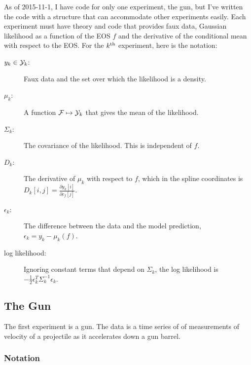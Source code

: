 \documentclass[11pt]{article}
\newcommand{\eos}{f}
\newcommand{\EOS}{{\cal F}}
\newcommand{\data}{y}
\newcommand{\DATA}{{\cal Y}}
\newcommand\cf{c_f}
\begin{document}
As of 2015-11-1, I have code for only one experiment, the gun, but
I've written the code with a structure that can accommodate other
experiments easily.  Each experiment must have theory and code that
provides faux data, Gaussian likelihood as a function of the EOS
$\eos$ and the derivative of the conditional mean with respect to the
EOS.  For the $k^{\rm th}$ experiment, here is the notation:
\begin{description}
\item[$\data_k\in \DATA_k$:] Faux data and the set over which the
  likelihood is a density.
\item[$\mu_k$:] A function $\EOS\mapsto \DATA_k$ that gives the mean
  of the likelihood.
\item[$\Sigma_k$:] The covariance of the likelihood.  This is
  independent of $\eos$.
\item[$D_k$:] The derivative of $\mu_k$ with respect to $\eos$, which
  in the spline coordinates is
  $D_k[i,j] =\frac{\partial \data_k[i]}{\partial \cf[j]}$.
\item[$\epsilon_k$:] The difference between the data and the model
  prediction, $\epsilon_k = \data_k - \mu_k(\eos)$.
\item[log likelihood:] Ignoring constant terms that depend on
  $\Sigma_k$, the log likelihood is $-\frac{1}{2}\epsilon_k^T
  \Sigma_k^{-1} \epsilon_k$.
\end{description}

\subsection{The Gun}
\label{sec:gun}

The first experiment is a gun.  The data is a time series of
of measurements of velocity of a projectile as it accelerates down a
gun barrel.

\subsubsection{Notation}
\label{sec:basic_notation}
\end{document}
